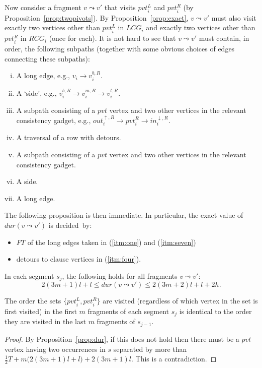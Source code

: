 \documentclass[envcountsame]{llncs}
\begin{document}
Now consider a fragment $v \leadsto v'$ that visits $\mathit{pvt}_i^L$ and $\mathit{pvt}_i^R$ (by Proposition~\ref{prop:twopivots}).
By Proposition~\ref{prop:exact}, $v \leadsto v'$ must also visit exactly two vertices other than $\mathit{pvt}_i^L$ in $\mathit{LCG}_i$
and exactly two vertices other than $\mathit{pvt}_i^R$ in $\mathit{RCG}_i$ (once for each).
It is not hard to see that $v \leadsto v'$ must contain, in order, the following subpaths (together with
some obvious choices of edges connecting these subpaths):
\begin{enumerate}[(i).]
\item \label{itm:one} A long edge, e.g., $v_i \rightarrow v_i^{b, R}$.
\item A `side', e.g., $v_i^{b, R} \rightarrow v_i^{m, R} \rightarrow v_i^{t, R}$.
\item A subpath consisting of a $\mathit{pvt}$ vertex and two other vertices in the relevant consistency gadget,
e.g., $\mathit{out}^{\uparrow, R}_i \rightarrow \mathit{pvt}^R_i \rightarrow \mathit{in}^{\downarrow, R}_i$.
\item \label{itm:four} A traversal of a row with detours.
\item A subpath consisting of a $\mathit{pvt}$ vertex and two other vertices in the relevant consistency gadget.
\item A side.
\item \label{itm:seven} A long edge.
\end{enumerate}
The following proposition is then immediate. In particular, the exact value of $\mathit{dur}(v \leadsto v')$ is \mbox{decided by}:
\begin{itemize}
\item $\mathit{FT}$ of the long edges taken in (\ref{itm:one}) and (\ref{itm:seven})
\item detours to clause vertices in (\ref{itm:four}).
\end{itemize}
\begin{proposition}\label{prop:dur}
In each segment $s_j$, the following holds for all fragments \mbox{$v \leadsto v'$}:
\[
2 (3m+1)l + l \leq \mathit{dur}(v \leadsto v') \leq 2 (3m+2)l + l + 2h.
\]
\end{proposition}

\begin{proposition}\label{prop:sameorder}
The order the sets $\{\mathit{pvt}_i^L, \mathit{pvt}_i^R\}$ are visited (regardless
of which vertex in the set is first visited) in the first $m$ fragments of each segment $s_j$
is identical to the order they are visited in the last $m$ fragments of $s_{j-1}$.
\end{proposition}
\begin{proof}
By Proposition~\ref{prop:dur}, if this does not hold then there must be a $\mathit{pvt}$ vertex
having two occurrences in $s$ separated by more than $\frac{1}{2}T + m\big(2 (3m+1)l + l\big) + 2(3m+1)l$.
This is a contradiction.
\end{proof}
\end{document}
